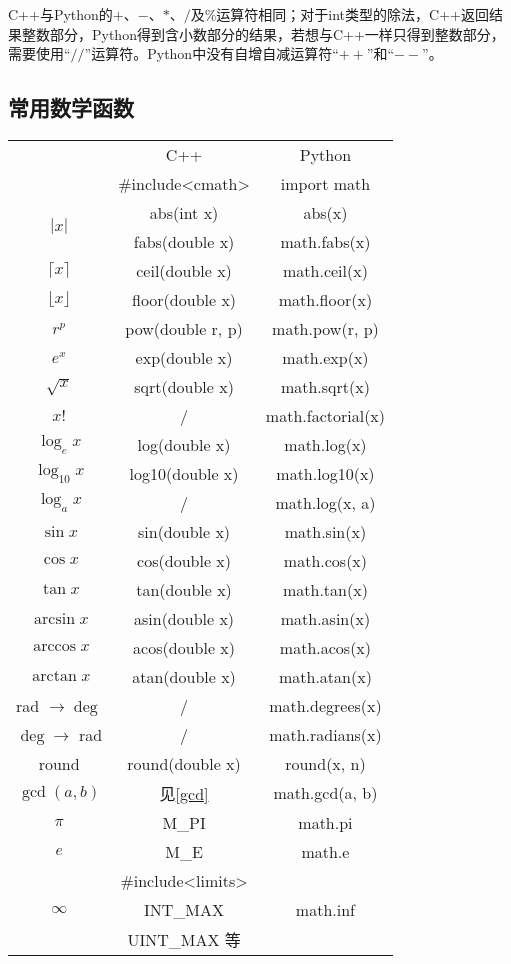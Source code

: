 C++与Python的$+$、$-$、$*$、$/$及$\%$运算符相同；对于int类型的除法，C++返回结果整数部分，Python得到含小数部分的结果，若想与C++一样只得到整数部分，需要使用“$//$”运算符。Python中没有自增自减运算符“$++$”和“$--$”。

\subsection{常用数学函数}
\label{mathfunc}

\begin{table}[htbp]
	\centering
	\begin{tabular}{ccc}
		\hline
		& C++ & Python \\
		& \#include<cmath> & import math \\
		\hline
		\multirow{2}{*}{$|x|$} & abs(int x) & abs(x) \\
		& fabs(double x) & math.fabs(x) \\
		\hline
		$\lceil x \rceil$ & ceil(double x) & math.ceil(x) \\
		$\lfloor x \rfloor$ & floor(double x) & math.floor(x) \\
		\hline
		$r^p$ & pow(double r, p) & math.pow(r, p) \\
		$e^x$ & exp(double x) & math.exp(x) \\
		\hline
		$\sqrt{x}$ & sqrt(double x) & math.sqrt(x) \\
		\hline
		$x!$ & / & math.factorial(x) \\
		\hline
		$\log_{e} x$ & log(double x) & math.log(x) \\
		$\log_{10} x$ & log10(double x) & math.log10(x) \\
		$\log_{a} x$ & / & math.log(x, a) \\
		\hline
		$\sin x$ & sin(double x) & math.sin(x) \\
		$\cos x$ & cos(double x) & math.cos(x) \\
		$\tan x$ & tan(double x) & math.tan(x) \\
		\hline
		$\arcsin x$ & asin(double x) & math.asin(x) \\
		$\arccos x$ & acos(double x) & math.acos(x) \\
		$\arctan x$ & atan(double x) & math.atan(x) \\
		\hline
		rad $\to\deg$ & / & math.degrees(x) \\
		$\deg\to$ rad & / & math.radians(x) \\
		\hline
		round & round(double x) & round(x, n) \\
		\hline
		$\gcd (a, b)$ & 见\ref{gcd} & math.gcd(a, b) \\
		\hline
		$\pi$ & M\_PI& math.pi \\
		$e$ & M\_E & math.e \\
		\hline
		\multirow{3}{*}{$\infty$} & \#include<limits> & \multirow{3}{*}{math.inf} \\
		& INT\_MAX & \\
		& UINT\_MAX 等 & \\
		\hline
	\end{tabular}
\end{table}

